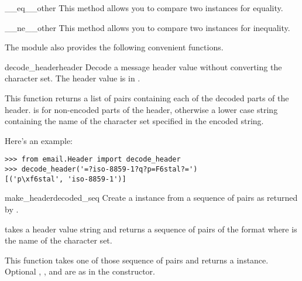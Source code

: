 \begin{methoddesc}[Header]{__eq__}{other}
This method allows you to compare two  instances for equality.
\end{methoddesc}

\begin{methoddesc}[Header]{__ne__}{other}
This method allows you to compare two  instances for inequality.
\end{methoddesc}

The  module also provides the following
convenient functions.

\begin{funcdesc}{decode_header}{header}
Decode a message header value without converting the character set.
The header value is in .

This function returns a list of  pairs
containing each of the decoded parts of the header.   is
 for non-encoded parts of the header, otherwise a lower
case string containing the name of the character set specified in the
encoded string.

Here's an example:

\begin{verbatim}
>>> from email.Header import decode_header
>>> decode_header('=?iso-8859-1?q?p=F6stal?=')
[('p\xf6stal', 'iso-8859-1')]
\end{verbatim}
\end{funcdesc}

\begin{funcdesc}{make_header}{decoded_seq}
Create a  instance from a sequence of pairs as returned
by .

 takes a header value string and returns a
sequence of pairs of the format  where
 is the name of the character set.

This function takes one of those sequence of pairs and returns a
 instance.  Optional ,
, and  are as in the
 constructor.
\end{funcdesc}
